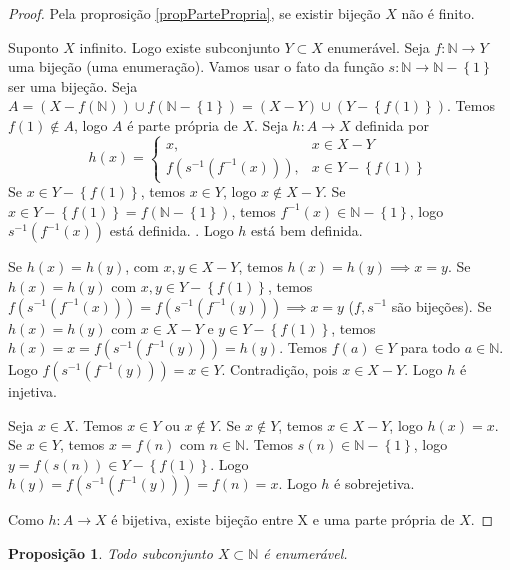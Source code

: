 \documentclass{article}
\newtheorem{prop}{Proposição}[section]
\theoremstyle{theorem}
\theoremstyle{lemma}
\theoremstyle{definition}
\theoremstyle{remark}
\begin{document}
\begin{proof}
	
	Pela proprosição \ref{propPartePropria}, se existir bijeção $X$ não é finito.

	Suponto $X$ infinito. Logo existe subconjunto $Y\subset X$ enumerável. Seja $f:\mathbb{N} \to Y$ uma bijeção (uma enumeração). Vamos usar o fato da função $s: \mathbb{N} \to \mathbb{N} -\left\{1\right\}$ ser uma bijeção.  Seja $A = \left(X- f\left(\mathbb{N}\right)\right) \cup f(\mathbb{N} - \left\{1\right\}) = (X - Y) \cup (Y - \left\{f(1)\right\}) $. Temos $f(1) \not \in A$, logo $A$ é parte própria de $X$. Seja $h: A \to X$ definida por $$ h(x) = \begin{cases} x, & x\in X-Y\\
	f(s^{-1}(f^{-1}(x))), & x\in Y - \left\{f(1)\right\} \end{cases}$$
	Se $x\in Y-\left\{f(1)\right\}$, temos $x\in Y$, logo $x\not \in X- Y$. Se $x\in Y - \left\{f(1) \right\} = f(\mathbb{N} - \left\{1\right\})$, temos $f^{-1}(x) \in \mathbb{N} - \left\{ 1\right\}$, logo $s^{-1}(f^{-1}(x))$ está definida.  . Logo $h$ está bem definida.

	 Se $h(x) = h(y)$, com $x,y \in X - Y$, temos $h(x) = h(y) \implies x = y$. Se $h(x) = h(y) $ com $x,y \in Y-\left\{f(1) \right\}$, temos $f(s^{-1}(f^{-1}(x))) = f(s^{-1}(f^{-1}(y))) \implies  x = y$ ($f,s^{-1}$ são bijeções).  Se $h(x) = h(y)$ com $x\in X-Y$ e $y\in Y- \left\{f(1)\right\}$, temos $h(x) = x = f(s^{-1}(f^{-1}(y))) = h(y)$. Temos $f(a) \in Y$ para todo $a\in \mathbb{N}$. Logo  $ f(s^{-1}(f^{-1}(y))) = x \in Y $. Contradição, pois $x\in X - Y$. Logo $h$ é injetiva.


	 Seja $x\in X$. Temos $x\in Y$ ou $x\not \in Y$. Se $x\not \in Y$, temos $x \in X-Y$, logo $h(x) = x$. Se $x\in Y$, temos  $x = f(n)$ com $n\in \mathbb{N}$. Temos $s(n) \in \mathbb{N} - \left\{1\right\}$, logo $ y = f(s(n)) \in Y - \left\{f(1) \right\}$. Logo $h(y) = f(s^{-1}(f^{-1}(y))) = f(n) = x$. Logo $h$ é sobrejetiva.
	 
	 Como $h:A \to X$ é bijetiva, existe bijeção entre X e uma parte própria de $X$.
\end{proof}
\begin{prop}
	Todo subconjunto $X\subset\mathbb{N}$ é enumerável.
\end{prop}
\end{document}
